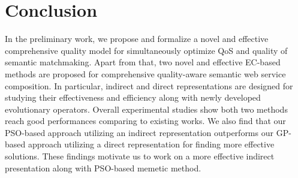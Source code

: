 \section{Conclusion}\label{summary2}
In the preliminary work, we propose and formalize a novel and effective comprehensive quality model for simultaneously optimize QoS and quality of semantic matchmaking. Apart from that, two novel and effective EC-based methods are proposed for comprehensive quality-aware semantic web service composition. In particular, indirect and direct representations are designed for studying their effectiveness and efficiency along with newly developed evolutionary operators. Overall experimental studies show both two methods reach good performances comparing to existing works. We also find that our PSO-based approach utilizing an indirect representation outperforms our GP-based approach utilizing a direct representation for finding more effective solutions. These findings motivate us to work on a more effective indirect presentation along with PSO-based memetic method.
